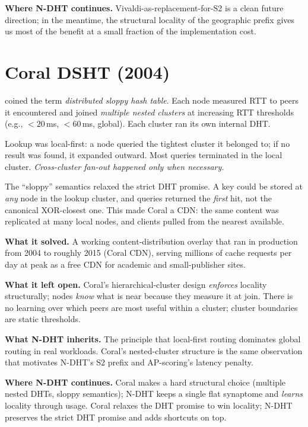 \documentclass[twoside,nobib]{tufte-book}
\newcommand{\NDHT}{N-DHT\xspace}
\begin{document}
\textbf{Where \NDHT continues.} Vivaldi-as-replacement-for-S2 is a
clean future direction; in the meantime, the structural locality
of the geographic prefix gives us most of the benefit at a small
fraction of the implementation cost.

\section{Coral DSHT (2004)}

coined the term \emph{distributed sloppy hash table}. Each node
measured RTT to peers it encountered and joined \emph{multiple
nested clusters} at increasing RTT thresholds (e.g., $< 20$\,ms,
$< 60$\,ms, global). Each cluster ran its own internal DHT.

Lookup was local-first: a node queried the tightest cluster it
belonged to; if no result was found, it expanded outward. Most
queries terminated in the local cluster. \emph{Cross-cluster
fan-out happened only when necessary.}

The ``sloppy'' semantics relaxed the strict DHT promise. A key
could be stored at \emph{any} node in the lookup cluster, and
queries returned the \emph{first} hit, not the canonical
XOR-closest one. This made Coral a CDN: the same content was
replicated at many local nodes, and clients pulled from the
nearest available.

\textbf{What it solved.} A working content-distribution overlay
that ran in production from 2004 to roughly 2015 (Coral CDN),
serving millions of cache requests per day at peak as a free CDN
for academic and small-publisher sites.

\textbf{What it left open.} Coral's hierarchical-cluster design
\emph{enforces} locality structurally; nodes \emph{know} what is
near because they measure it at join. There is no learning over
which peers are most useful within a cluster; cluster boundaries
are static thresholds.

\textbf{What \NDHT inherits.} The principle that local-first
routing dominates global routing in real workloads. Coral's
nested-cluster structure is the same observation that motivates
\NDHT's S2 prefix and AP-scoring's latency penalty.

\textbf{Where \NDHT continues.} Coral makes a hard structural
choice (multiple nested DHTs, sloppy semantics); \NDHT keeps a
single flat synaptome and \emph{learns} locality through usage.
Coral relaxes the DHT promise to win locality; \NDHT preserves the
strict DHT promise and adds shortcuts on top.
\end{document}
